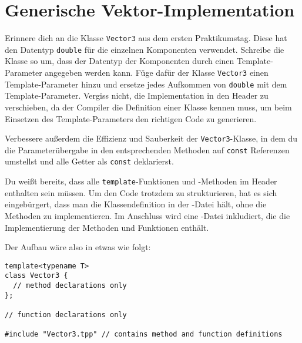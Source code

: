 \section{Generische Vektor-Implementation}
Erinnere dich an die Klasse \lstinline{Vector3} aus dem ersten Praktikumstag. Diese hat den Datentyp \lstinline{double} für die einzelnen Komponenten verwendet. Schreibe die Klasse so um, dass der Datentyp der Komponenten durch einen Template-Parameter angegeben werden kann.
Füge dafür der Klasse \lstinline{Vector3} einen Template-Parameter hinzu und ersetze jedes Aufkommen von \lstinline{double} mit dem Template-Parameter.
Vergiss nicht, die Implementation in den Header zu verschieben, da der Compiler die Definition einer Klasse kennen muss, um beim Einsetzen des Template-Parameters den richtigen Code zu generieren.

Verbessere außerdem die Effizienz und Sauberkeit der \lstinline{Vector3}-Klasse, in dem du die Parameterübergabe in den entsprechenden Methoden auf \lstinline{const} Referenzen umstellst und alle Getter als \lstinline{const} deklarierst.

Du weißt bereits, dass alle \lstinline{template}-Funktionen und -Methoden im Header enthalten sein müssen.
Um den Code trotzdem zu strukturieren, hat es sich eingebürgert, dass man die Klassendefinition in der -Datei hält, ohne die Methoden zu implementieren.
Im Anschluss wird eine -Datei inkludiert, die die Implementierung der Methoden und Funktionen enthält.
    
Der Aufbau wäre also in etwas wie folgt:
\begin{lstlisting}
template<typename T>
class Vector3 {
  // method declarations only
};

// function declarations only

#include "Vector3.tpp" // contains method and function definitions
\end{lstlisting}
